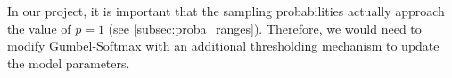 \documentclass[a4paper,11pt,oneside]{report}
\begin{document}
\begin{enumerate}
    In our project, it is important that the sampling probabilities actually approach the value of $p=1$ (see \autoref{subsec:proba_ranges}). Therefore, we would need to modify Gumbel-Softmax with an additional thresholding mechanism to update the model parameters.

%
%
%
%









\end{enumerate}
\end{document}
